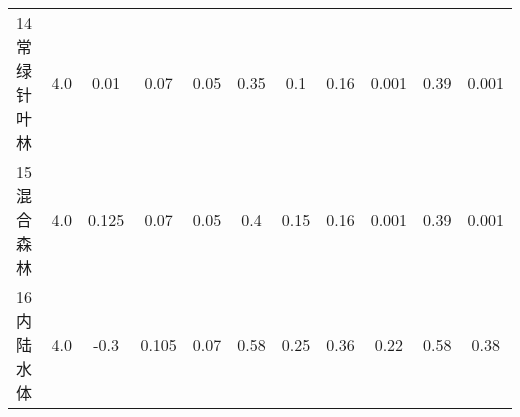 \begin{sidewaystable}[]
\begin{tabular}{@{}lcccccccccc@{}}
        14 常绿针叶林   & 4.0        & 0.01                                                                         & 0.07                                                                                                            & 0.05                                                                                                            & 0.35                                                                                                            & 0.1                                                                                                             & 0.16                                                                                                            & 0.001                                                                                                           & 0.39                                                                                                            & 0.001                                                                                                           \\
        15 混合森林    & 4.0        & 0.125                                                                        & 0.07                                                                                                            & 0.05                                                                                                            & 0.4                                                                                                             & 0.15                                                                                                            & 0.16                                                                                                            & 0.001                                                                                                           & 0.39                                                                                                            & 0.001                                                                                                           \\
        16 内陆水体    & 4.0        & -0.3                                                                         & 0.105                                                                                                           & 0.07                                                                                                            & 0.58                                                                                                            & 0.25                                                                                                            & 0.36                                                                                                            & 0.22                                                                                                            & 0.58                                                                                                            & 0.38                                                                                                            \\

\end{tabular}
\end{sidewaystable}
